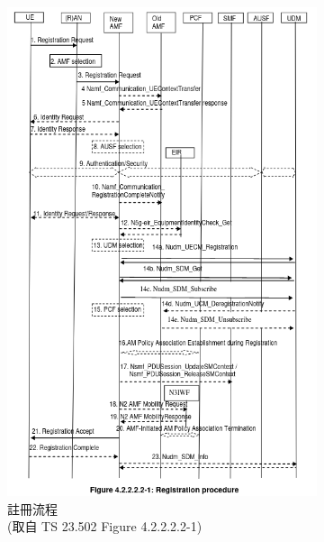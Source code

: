 \begin{figure}[htbp]
  \centering
  \captionsetup{justification=centering}
  \begin{subfigure}[b]{.5\linewidth}
      \centering
      \includegraphics[height=!,width=0.835\linewidth,keepaspectratio=true]{figures/23_502_4_2_2_2_2-1_reg_proc}
      \caption[註冊流程]{{註冊流程\\\scriptsize (取自 TS 23.502 Figure 4.2.2.2.2-1)}}
      \label{fig:reg_proc}
  \end{subfigure}%
  \begin{subfigure}[b]{.5\linewidth}
      \centering

\end{subfigure}
\end{figure}
